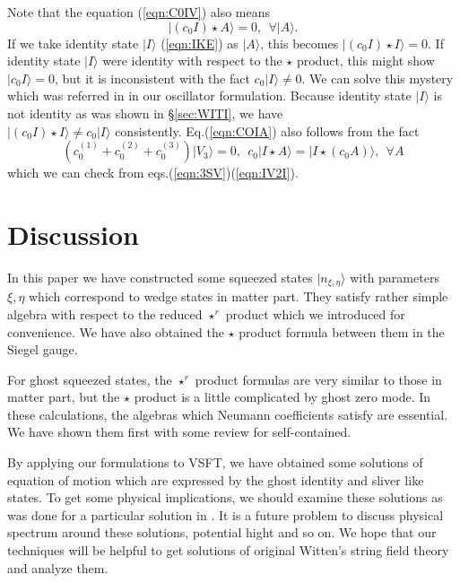 \documentclass[12pt,a4paper]{article}
\begin{document}
Note that the equation (\ref{eqn:C0IV}) also means
\begin{equation}
\label{eqn:COIA}
|(c_0I)\star A\rangle=0,\ \ \forall |A\rangle.
\end{equation}
If we take identity state $|I\rangle$ (\ref{eqn:IKE}) as $|A\rangle$, this becomes $|(c_0I)\star I\rangle=0$. If identity state $|I\rangle$ were identity with respect to the $\star$ product, this might show $|c_0I\rangle=0$, but it is inconsistent with the fact $c_0|I\rangle\not=0$. We can solve this mystery which was referred in \cite{RZ} in our oscillator formulation.
Because identity state $|I\rangle$ is not identity  as was shown in \S \ref{sec:WITI}, we have \\ $|(c_0I)\star I\rangle\not=c_0|I\rangle$ consistently. Eq.(\ref{eqn:COIA}) also follows from the fact
\begin{equation}
 (c_0^{(1)}+c_0^{(2)}+c_0^{(3)})|V_3\rangle=0,\ \ c_0|I\star A\rangle=|I\star(c_0A)\rangle,\ \ \forall A
\end{equation}
which we can check from eqs.(\ref{eqn:3SV})(\ref{eqn:IV2I}).


\section{Discussion \label{sec:DIS}}

In this paper we have constructed some squeezed states $|n_{\xi,\eta}\rangle$ with parameters $\xi,\eta$ which correspond to wedge states in matter part. They satisfy rather simple algebra with respect to the reduced $\star^r$ product which we introduced for convenience. We have also obtained the $\star$ product formula between them in the Siegel gauge. 

For ghost squeezed states, the $\star^r$ product formulas are very similar to those in matter part, but the $\star$ product is a little complicated by ghost zero mode.
In these calculations, the algebras which Neumann coefficients satisfy are essential. We have shown them first with some review for self-contained.

By applying our formulations to VSFT, we have obtained some solutions of equation of motion which are expressed by the ghost identity and sliver like states. To get some physical implications, we should examine these solutions as was done for a particular solution in \cite{HK}. It is a future problem to discuss physical spectrum around these solutions, potential hight and so on.
We hope that our techniques will be helpful to get solutions of original Witten's string field theory and analyze them.
\end{document}
